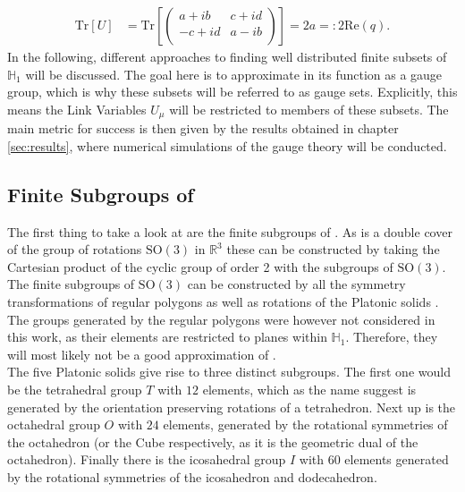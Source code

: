 \begin{align*}
 \mathrm{Tr}\left[ U \right] & = \mathrm{Tr}\left[ \begin{pmatrix}
   a + ib  & c + id \\
   -c + id & a - ib \\
  \end{pmatrix} \right] = 2 a = : 2 \mathrm{Re} (q) \textrm{.}
\end{align*}
In the following, different approaches to finding well distributed finite subsets of $\mathbb{H}_1$ will be discussed. The goal here is to approximate \SUTwo in its function as a gauge group, which is why these subsets will be referred to as gauge sets. Explicitly, this means the Link Variables $U_\mu$ will be restricted to members of these subsets. The main metric for success is then given by the results obtained in chapter \ref{sec:results}, where numerical simulations of the gauge theory will be conducted.

\subsection{Finite Subgroups of \SUTwo}

The first thing to take a look at are the finite subgroups of \SUTwo. As \SUTwo is a double cover of the group of rotations $\mathrm{SO(3)}$ in $\mathbb{R}^3$ these can be constructed by taking the Cartesian product of the cyclic group of order 2 with the subgroups of $\mathrm{SO}(3)$. The finite subgroups of $\mathrm{SO}(3)$ can be constructed by all the symmetry transformations of regular polygons as well as rotations of the Platonic solids \cite{Klein:1880}. The groups generated by the regular polygons were however not considered in this work, as their elements are restricted to planes within $\mathbb{H}_1$. Therefore, they will most likely not be a good approximation of \SUTwo.\\

The five Platonic solids give rise to three distinct subgroups. The first one would be the tetrahedral group $T$ with $12$ elements, which as the name suggest is generated by the orientation preserving rotations of a tetrahedron. Next up is the octahedral group $O$ with $24$ elements, generated by the rotational symmetries of the octahedron (or the Cube respectively, as it is the geometric dual of the octahedron). Finally there is the icosahedral group $I$ with $60$ elements generated by the rotational symmetries of the icosahedron and dodecahedron.

